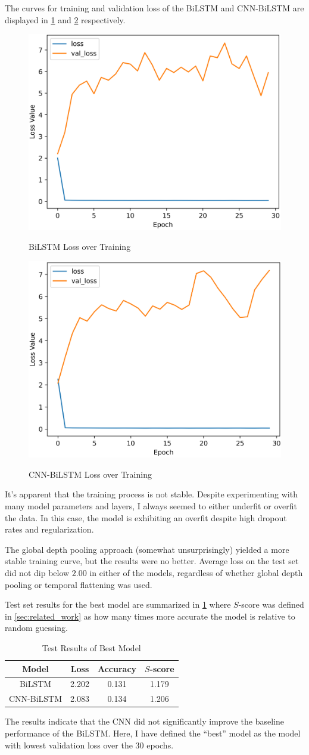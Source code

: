 \documentclass[11pt,a4paper]{article}
\begin{document}
The curves for training and validation loss of the BiLSTM and CNN-BiLSTM are displayed in \cref{fig:bilstm_loss} and \cref{fig:cnn_bilstm_loss} respectively.
\begin{figure}[H]
  \centering
  \caption{BiLSTM Loss over Training}
  \includegraphics[width=.48\textwidth]{bilstm_loss.png}
  \label{fig:bilstm_loss}
\end{figure}
\begin{figure}[H]
  \centering
  \caption{CNN-BiLSTM Loss over Training}
  \includegraphics[width=.48\textwidth]{cnn_bilstm_loss.png}
  \label{fig:cnn_bilstm_loss}
\end{figure}

It's apparent that the training process is not stable. Despite experimenting with many model parameters and layers, I always seemed to either underfit or overfit the data. In this case, the model is exhibiting an overfit despite high dropout rates and regularization.

The global depth pooling approach (somewhat unsurprisingly) yielded a more stable training curve, but the results were no better. Average loss on the test set did not dip below \(2.00\) in either of the models, regardless of whether global depth pooling or temporal flattening was used.

Test set results for the best model are summarized in \cref{tab:test_results} where \(S\)-score was defined in \cref{sec:related_work} as how many times more accurate the model is relative to random guessing.
\begin{table}[h]
  \centering
  \caption{Test Results of Best Model}
  \begin{tabular}{c|c|c|c}
    Model      & Loss  & Accuracy & \(S\)-score \\
    \hline
    BiLSTM     & 2.202 & 0.131    & 1.179       \\
    CNN-BiLSTM & 2.083 & 0.134    & 1.206
  \end{tabular}
  \label{tab:test_results}
\end{table}
The results indicate that the CNN did not significantly improve the baseline performance of the BiLSTM. Here, I have defined the ``best'' model as the model with lowest validation loss over the 30 epochs.
\end{document}
